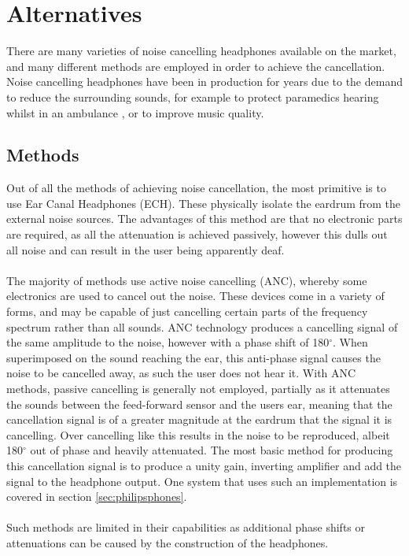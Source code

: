 \section{Alternatives}

There are many varieties of noise cancelling headphones available on the market, and many different methods are employed in order to achieve the cancellation.
Noise cancelling headphones have been in production for years due to the demand to reduce the surrounding sounds, for example to protect paramedics hearing whilst in an ambulance \cite{EMHeadsets}, or to improve music quality.

\subsection{Methods}
Out of all the methods of achieving noise cancellation, the most primitive is to use Ear Canal Headphones (ECH).
These physically isolate the eardrum from the external noise sources.
The advantages of this method are that no electronic parts are required, as all the attenuation is achieved passively, however this dulls out all noise and can result in the user being apparently deaf.
\\
\\
The majority of methods use active noise cancelling (ANC), whereby some electronics are used to cancel out the noise.
These devices come in a variety of forms, and may be capable of just cancelling certain parts of the frequency spectrum rather than all sounds.
ANC technology produces a cancelling signal of the same amplitude to the noise, however with a phase shift of 180$^{\circ}$.
When superimposed on the sound reaching the ear, this anti-phase signal causes the noise to be cancelled away, as such the user does not hear it.
With ANC methods, passive cancelling is generally not employed, partially as it attenuates the sounds between the feed-forward sensor and the users ear, meaning that the cancellation signal is of a greater magnitude at the eardrum that the signal it is cancelling.
Over cancelling like this results in the noise to be reproduced, albeit 180$^{\circ}$ out of phase and heavily attenuated.
The most basic method for producing this cancellation signal is to produce a unity gain, inverting amplifier and add the signal to the headphone output.
One system that uses such an implementation is covered in section \ref{sec:philipsphones}.
\\
\\
Such methods are limited in their capabilities as additional phase shifts or attenuations can be caused by the construction of the headphones.
